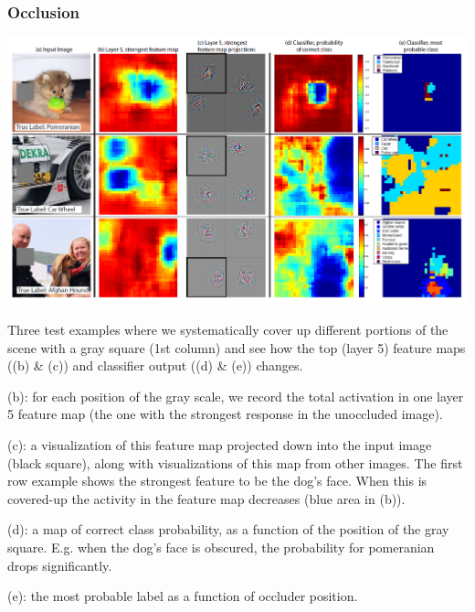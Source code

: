\begin{frame}[allowframebreaks]
	\frametitle{Occlusion}
	
	\begin{center}
		\includegraphics[scale=0.5]{figs/ZFNet_occlusion}
	\end{center}

\framebreak 

Three test examples where we systematically cover up different portions of the scene with a gray square (1st
column) and see how the top (layer 5) feature maps ((b) \& (c)) and classifier output ((d) \& (e)) changes. 

\medskip  


(b): for each
position of the gray scale, we record the total activation in one layer 5 feature map (the one with the strongest response
in the unoccluded image). 

\smallskip 

(c): a visualization of this feature map projected down into the input image (black square), along with visualizations of this map from other images. The first row example shows the strongest feature to be the
dog's face. When this is covered-up the activity in the feature map decreases (blue area in (b)). 

\smallskip 
(d): a map of correct
class probability, as a function of the position of the gray square. E.g. when the dog's face is obscured, the probability
for pomeranian drops significantly. 

\smallskip 
(e): the most probable label as a function of occluder position. 
\end{frame}











